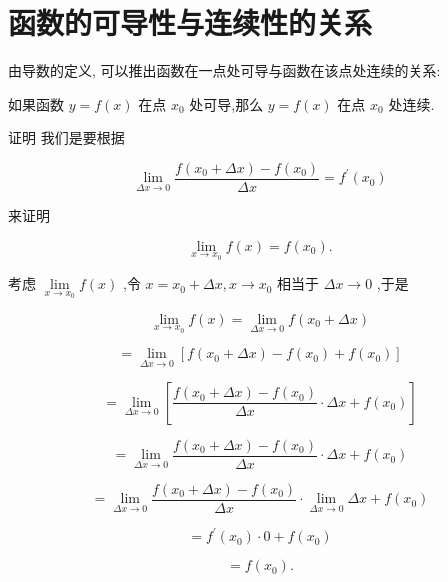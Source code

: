 \documentclass[lang=cn,newtx,12pt,scheme=chinese]{elegantbook}
\begin{document}
\section{函数的可导性与连续性的关系}

由导数的定义, 可以推出函数在一点处可导与函数在该点处连续的关系:

\begin{conclusion}
	如果函数 \(y = f\left( x\right)\) 在点 \({x}_{0}\) 处可导,那么 \(y = f\left( x\right)\) 在点 \({x}_{0}\) 处连续.
\end{conclusion}

证明 我们是要根据

\[
\mathop{\lim }\limits_{{{\Delta x} \rightarrow 0}}\frac{f\left( {{x}_{0} + {\Delta x}}\right) - f\left( {x}_{0}\right) }{\Delta x} = {f}^{\prime }\left( {x}_{0}\right)
\]

来证明

\[
\mathop{\lim }\limits_{{x \rightarrow {x}_{0}}}f\left( x\right) = f\left( {x}_{0}\right) .
\]

考虑 \(\mathop{\lim }\limits_{{x \rightarrow {x}_{0}}}f\left( x\right)\) ,令 \(x = {x}_{0} + {\Delta x},x \rightarrow {x}_{0}\) 相当于 \({\Delta x} \rightarrow 0\) ,于是

\[
\mathop{\lim }\limits_{{x \rightarrow {x}_{0}}}f\left( x\right) = \mathop{\lim }\limits_{{{\Delta x} \rightarrow 0}}f\left( {{x}_{0} + {\Delta x}}\right)
\]

\[
= \mathop{\lim }\limits_{{{\Delta x} \rightarrow 0}}\left\lbrack {f\left( {{x}_{0} + {\Delta x}}\right) - f\left( {x}_{0}\right) + f\left( {x}_{0}\right) }\right\rbrack
\]

\[
= \mathop{\lim }\limits_{{{\Delta x} \rightarrow 0}}\left\lbrack {\frac{f\left( {{x}_{0} + {\Delta x}}\right) - f\left( {x}_{0}\right) }{\Delta x} \cdot {\Delta x} + f\left( {x}_{0}\right) }\right\rbrack
\]

\[
= \mathop{\lim }\limits_{{{\Delta x} \rightarrow 0}}\frac{f\left( {{x}_{0} + {\Delta x}}\right) - f\left( {x}_{0}\right) }{\Delta x} \cdot {\Delta x} + f\left( {x}_{0}\right)
\]

\[
= \mathop{\lim }\limits_{{{\Delta x} \rightarrow 0}}\frac{f\left( {{x}_{0} + {\Delta x}}\right) - f\left( {x}_{0}\right) }{\Delta x} \cdot \mathop{\lim }\limits_{{{\Delta x} \rightarrow 0}}{\Delta x} + f\left( {x}_{0}\right)
\]

\[
= {f}^{\prime }\left( {x}_{0}\right) \cdot 0 + f\left( {x}_{0}\right)
\]

\[
= f\left( {x}_{0}\right) \text{.}
\]
\end{document}
